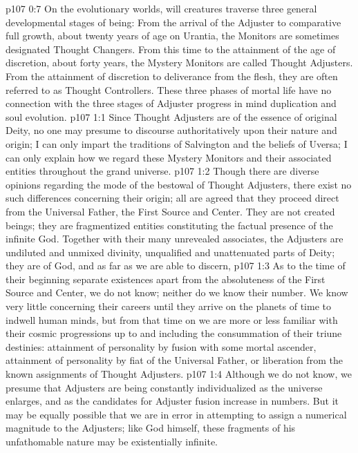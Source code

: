 \pc \vs p107 0:7 On the evolutionary worlds, will creatures traverse three general developmental stages of being: From the arrival of the Adjuster to comparative full growth, about twenty years of age on Urantia, the Monitors are sometimes designated Thought Changers. From this time to the attainment of the age of discretion, about forty years, the Mystery Monitors are called Thought Adjusters. From the attainment of discretion to deliverance from the flesh, they are often referred to as Thought Controllers. These three phases of mortal life have no connection with the three stages of Adjuster progress in mind duplication and soul evolution.\plusone
{}%
\vs p107 1:1 Since Thought Adjusters are of the essence of original Deity, no one may presume to discourse authoritatively upon their nature and origin; I can only impart the traditions of Salvington and the beliefs of Uversa; I can only explain how we regard these Mystery Monitors and their associated entities throughout the grand universe.
\vs p107 1:2 Though there are diverse opinions regarding the mode of the bestowal of Thought Adjusters, there exist no such differences concerning their origin; all are agreed that they proceed direct from the Universal Father, the First Source and Center. They are not created beings; they are fragmentized entities constituting the factual presence of the infinite God. Together with their many unrevealed associates, the Adjusters are undiluted and unmixed divinity, unqualified and unattenuated parts of Deity; they are of God, and as far as we are able to discern, \plusone
\vs p107 1:3 As to the time of their beginning separate existences apart from the absoluteness of the First Source and Center, we do not know; neither do we know their number. We know very little concerning their careers until they arrive on the planets of time to indwell human minds, but from that time on we are more or less familiar with their cosmic progressions up to and including the consummation of their triune destinies: attainment of personality by fusion with some mortal ascender, attainment of personality by fiat of the Universal Father, or liberation from the known assignments of Thought Adjusters.
\vs p107 1:4 Although we do not know, we presume that Adjusters are being constantly individualized as the universe enlarges, and as the candidates for Adjuster fusion increase in numbers. But it may be equally possible that we are in error in attempting to assign a numerical magnitude to the Adjusters; like God himself, these fragments of his unfathomable nature may be existentially infinite.
